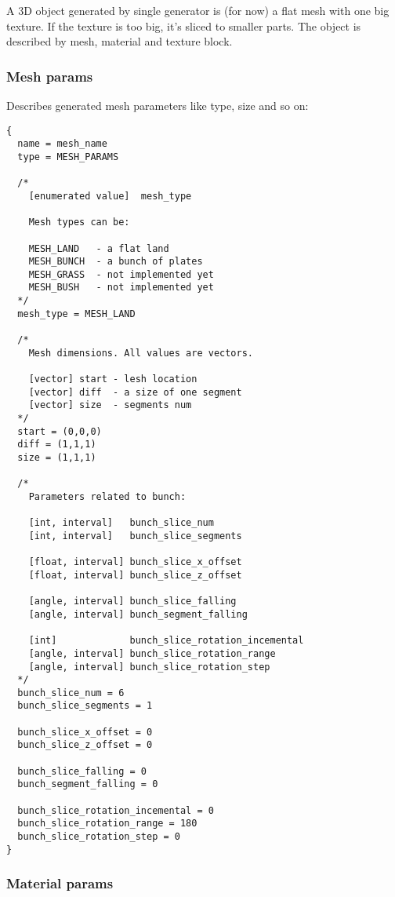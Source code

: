 \documentclass[11pt]{article}
\begin{document}
A 3D object generated by single generator is (for now) a flat mesh with
one big texture. If the texture is too big, it's sliced to smaller parts.
The object is described by mesh, material and texture block.

\subsubsection{Mesh params}

Describes generated mesh parameters like type, size and so on:

\begin{verbatim}
{
  name = mesh_name
  type = MESH_PARAMS

  /*
    [enumerated value]  mesh_type
  
    Mesh types can be:
   
    MESH_LAND   - a flat land
    MESH_BUNCH  - a bunch of plates
    MESH_GRASS  - not implemented yet
    MESH_BUSH   - not implemented yet
  */
  mesh_type = MESH_LAND
  
  /*
    Mesh dimensions. All values are vectors.
  
    [vector] start - lesh location 
    [vector] diff  - a size of one segment 
    [vector] size  - segments num
  */  
  start = (0,0,0)
  diff = (1,1,1)
  size = (1,1,1)
  
  /*
    Parameters related to bunch:
    
    [int, interval]   bunch_slice_num
    [int, interval]   bunch_slice_segments
      
    [float, interval] bunch_slice_x_offset
    [float, interval] bunch_slice_z_offset
      
    [angle, interval] bunch_slice_falling
    [angle, interval] bunch_segment_falling
        
    [int]             bunch_slice_rotation_incemental
    [angle, interval] bunch_slice_rotation_range
    [angle, interval] bunch_slice_rotation_step
  */    
  bunch_slice_num = 6
  bunch_slice_segments = 1
  
  bunch_slice_x_offset = 0
  bunch_slice_z_offset = 0
  
  bunch_slice_falling = 0
  bunch_segment_falling = 0
  
  bunch_slice_rotation_incemental = 0
  bunch_slice_rotation_range = 180
  bunch_slice_rotation_step = 0
}
\end{verbatim}

\subsubsection{Material params}
\end{document}
